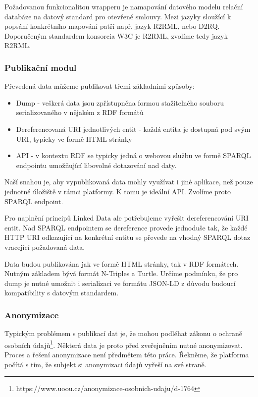 Požadovanou funkcionalitou wrapperu je namapování datového modelu relační databáze na datový standard pro otevřené smlouvy. Mezi jazyky sloužící k popsání konkrétního mapování patří např. jazyk R2RML, nebo D2RQ. Doporučeným standardem konsorcia W3C je R2RML, zvolíme tedy jazyk R2RML.

\subsubsection*{Publikační modul}

Převedená data můžeme publikovat třemi základními způsoby:

\begin{itemize}
\item Dump - veškerá data jsou zpřístupněna formou stažitelného souboru serializovaného v nějakém z RDF formátů
\item Dereferencovaná URI jednotlivých entit - každá entita je dostupná pod svým URI, typicky ve formě HTML stránky
\item API - v kontextu RDF se typicky jedná o webovou službu ve formě SPARQL endpointu umožňující libovolné dotazování nad daty.
\end{itemize}

Naší snahou je, aby vypublikovaná data mohly využívat i jiné aplikace, než pouze jednotné úložiště v rámci platformy. K tomu je ideální API. Zvolíme proto SPARQL endpoint.

Pro naplnění principů Linked Data ale potřebujeme vyřešit dereferencování URI entit. Nad SPARQL endpointem se dereference provede jednoduše tak, že každé HTTP URI odkazující na konkrétní entitu se převede na vhodný SPARQL dotaz vracející požadovaná data. 

Data budou publikována jak ve formě HTML stránky, tak v RDF formátech. Nutným základem bývá formát N-Triples a Turtle. Určíme podmínku, že pro dump je nutné umožnit i serializaci ve formátu JSON-LD z důvodu budoucí kompatibility s datovým standardem.

\subsubsection*{Anonymizace} 

Typickým problémem s publikací dat je, že mohou podléhat zákonu o ochraně osobních údajů\footnote{https://www.uoou.cz/anonymizace-osobnich-udaju/d-1764}. Některá data je proto před zveřejněním nutné anonymizovat. Proces a řešení anonymizace není předmětem této práce. Řekněme, že platforma počítá s tím, že subjekt si anonymizaci údajů vyřeší na své straně.

